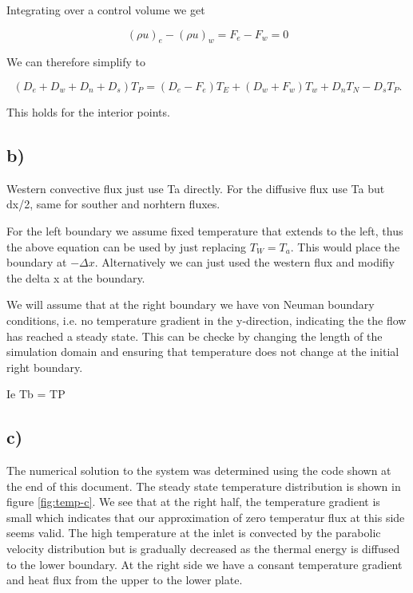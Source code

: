 \documentclass{article}
\begin{document}
Integrating over a control volume we get

\begin{equation}
(\rho u)_e - (\rho u)_w  = F_e - F_w = 0
\end{equation}

We can therefore simplify to

\begin{equation}
(D_e + D_w + D_n + D_s) T_P = (D_e - F_e) T_E + (D_w+F_w) T_w + D_n T_N - D_s T_P.
\end{equation}

This holds for the interior points.

\subsection{b)}

Western convective flux just use Ta directly. 
For the diffusive flux use Ta but dx/2, same for souther and norhtern fluxes.

For the left boundary we assume fixed temperature that extends to the left, thus the above equation can be used by just replacing $T_W = T_a$. This would place the boundary at $-\Delta x$. Alternatively we can just used the western flux and modifiy the delta x at the boundary.

We will assume that at the right boundary we have von Neuman boundary conditions, i.e. no temperature gradient in the y-direction, indicating the the flow has reached a steady state. This can be checke by changing the length of the simulation domain and ensuring that temperature does not change at the initial right boundary.

Ie Tb = TP

\subsection{c)}

The numerical solution to the system was determined using the code shown at the end of this document. The steady state temperature distribution is shown in figure \ref{fig:temp-c}. We see that at the right half, the temperature gradient is small which indicates that our approximation of zero temperatur flux at this side seems valid. The high temperature at the inlet is convected by the parabolic velocity distribution but is gradually decreased as the thermal energy is diffused to the lower boundary. At the right side we have a consant temperature gradient  and heat flux from the upper to the lower plate.
\end{document}
